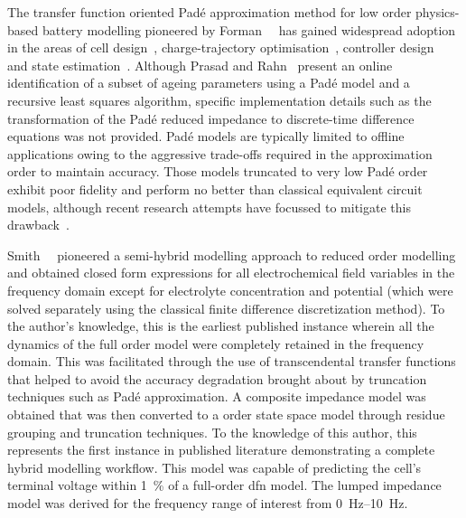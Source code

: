 The     transfer     function     oriented    Padé     approximation     method
for    low    order    physics-based     battery    modelling    pioneered    by
Forman~\etal{}~\cite{Forman2011a}    has   gained    widespread   adoption    in
the    areas     of    cell     design~\cite{Marcicki2013},    charge-trajectory
optimisation~\cite{Bashash2010},  controller  design~\cite{Perez2015} and  state
estimation~\cite{Marcicki2013,Moura2012,Bartlett2015}.   Although   Prasad   and
Rahn~\cite{Prasad2013} present  an online identification  of a subset  of ageing
parameters using a Padé model and a recursive least squares algorithm, specific
implementation details such as the transformation of the Padé reduced impedance
to  discrete-time  difference  equations  was not  provided.  Padé  models  are
typically limited  to offline  applications owing  to the  aggressive trade-offs
required in the approximation order to maintain accuracy. Those models truncated
to  very low  Padé  order exhibit  poor  fidelity and  perform  no better  than
classical  equivalent circuit  models,  although recent  research attempts  have
focussed  to  mitigate  this  drawback~\cite{Yuan2017a,Yuan2017}.


Smith~\etal{}~\cite{Smith2007}  pioneered   a  semi-hybrid   modelling  approach
to  reduced  order  modelling  and  obtained closed  form  expressions  for  all
electrochemical field variables  in the frequency domain  except for electrolyte
concentration and  potential (which were  solved separately using  the classical
finite difference discretization method). To the author's knowledge, this is the
earliest  published  instance  wherein  all  the  dynamics  of  the  full  order
model were  completely retained  in the frequency  domain. This  was facilitated
through  the use  of  transcendental  transfer functions  that  helped to  avoid
the  accuracy  degradation  brought  about  by  truncation  techniques  such  as
Padé  approximation. A  composite impedance  model was  obtained that  was then
converted  to  a    order state  space  model  through  residue
grouping  and truncation  techniques.  To  the knowledge  of  this author,  this
represents the first  instance in published literature  demonstrating a complete
hybrid  modelling workflow.  This model  was  capable of  predicting the  cell's
terminal voltage  within \SI{1}{\percent} of  a full-order \gls{dfn}  model. The
lumped impedance  model was  derived for  the frequency  range of  interest from
\SIrange{0}{10}{\hertz}.

